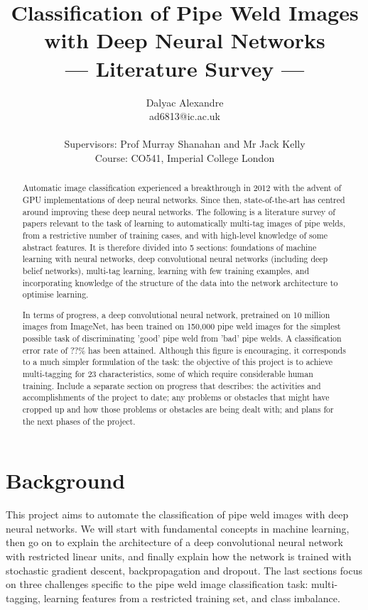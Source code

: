 \documentclass[a4paper,11pt]{article}
\title{Classification of Pipe Weld Images with Deep Neural Networks\\\Large{--- Literature Survey ---}}
\author{Dalyac Alexandre\\
       ad6813@ic.ac.uk\\ \\
       \small{Supervisors: Prof Murray Shanahan and Mr Jack Kelly}\\
       \small{Course: CO541, Imperial College London}
}
\begin{document}
\maketitle

\begin{abstract}

\abstract
{
\par Automatic image classification experienced a breakthrough in 2012 with the advent of GPU implementations of deep neural networks. Since then, state-of-the-art has centred around improving these deep neural networks. The following is a literature survey of papers relevant to the task of learning to automatically multi-tag images of pipe welds, from a restrictive number of training cases, and with high-level knowledge of some abstract features. It is therefore divided into 5 sections: foundations of machine learning with neural networks, deep convolutional neural networks (including deep belief networks), multi-tag learning, learning with few training examples, and incorporating knowledge of the structure of the data into the network architecture to optimise learning.\\

\par In terms of progress, a deep convolutional neural network, pretrained on 10 million images from ImageNet, has been trained on 150,000 pipe weld images for the simplest possible task of discriminating 'good' pipe weld from 'bad' pipe welds. A classification error rate of ??\% has been attained. Although this figure is encouraging, it corresponds to a much simpler formulation of the task: the objective of this project is to achieve multi-tagging for 23 characteristics, some of which require considerable human training.  Include a separate section on progress that describes: the activities and accomplishments of the project to date; any problems or obstacles that might have cropped up and how those problems or obstacles are being dealt with; and plans for the next phases of the project.
}
\end{abstract}

\clearpage
\tableofcontents

\clearpage
\section{Background}

This project aims to automate the classification of pipe weld images with deep neural networks. We will start with fundamental concepts in machine learning, then go on to explain the architecture of a deep convolutional neural network with restricted linear units, and finally explain how the network is trained with stochastic gradient descent, backpropagation and dropout. The last sections focus on three challenges specific to the pipe weld image classification task: multi-tagging, learning features from a restricted training set, and class imbalance.
\end{document}
